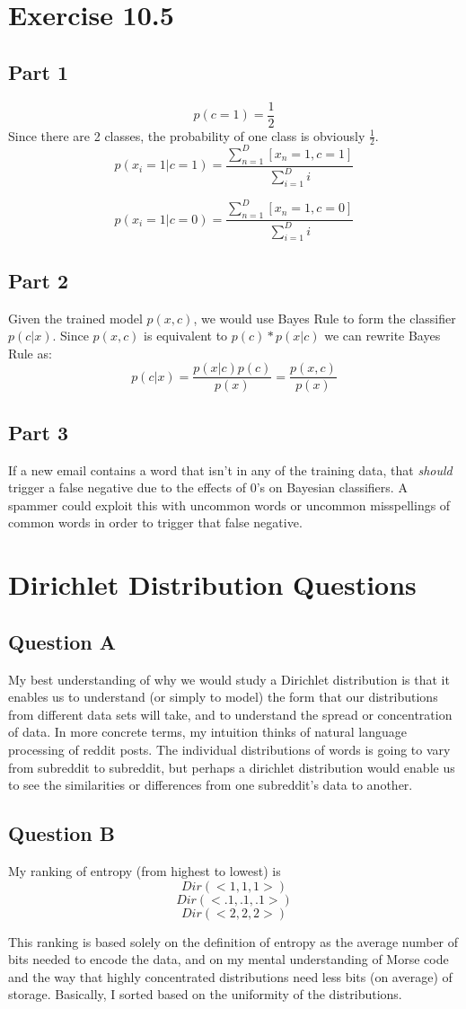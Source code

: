 \documentclass{article}
\begin{document}
\newpage
\section{Exercise 10.5}
\subsection{Part 1}
\[p(c=1) = \frac{1}{2}\]
Since there are 2 classes, the probability of one class is obviously $\frac{1}{2}$.
\[p(x_i=1 | c=1) = \frac{\sum\limits_{n=1}^{D}[x_n = 1,c = 1]}{\sum\limits_{i=1}^{D}i} \]

\[p(x_i=1 | c=0) = \frac{\sum\limits_{n=1}^{D}[x_n = 1,c = 0]}{\sum\limits_{i=1}^{D}i} \]

\subsection{Part 2}
Given the trained model $p(x,c)$, we would use Bayes Rule to form the classifier $p(c|x)$. Since $p(x,c)$ is equivalent to $p(c) * p(x|c)$ we can rewrite Bayes Rule as:
\[p(c|x) = \frac{p(x|c)p(c)}{p(x)} = \frac{p(x,c)}{p(x)} \]

\subsection{Part 3}
If a new email contains a word that isn't in any of the training data, that \textit{should} trigger a false negative due to the effects of 0's on Bayesian classifiers. A spammer could exploit this with uncommon words or uncommon misspellings of common words in order to trigger that false negative.

\newpage
\section{Dirichlet Distribution Questions}
\subsection{Question A}
My best understanding of why we would study a Dirichlet distribution is that it enables us to understand (or simply to model) the form that our distributions from different data sets will take, and to understand the spread or concentration of data.
\newline
In more concrete terms, my intuition thinks of natural language processing of reddit posts. The individual distributions of words is going to vary from subreddit to subreddit, but perhaps a dirichlet distribution would enable us to see the similarities or differences from one subreddit's data to another.
\subsection{Question B}
My ranking of entropy (from highest to lowest) is 
\[Dir(<1,1,1>) \] 
\[Dir(<.1,.1,.1>) \] 
\[Dir(<2,2,2>) \]

This ranking is based solely on the definition of entropy as the average number of bits needed to encode the data, and on my mental understanding of Morse code and the way that highly concentrated distributions need less bits (on average) of storage. Basically, I sorted based on the uniformity of the distributions. 
\end{document}
